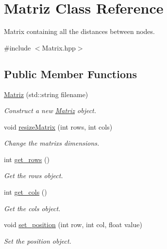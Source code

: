 \hypertarget{classMatriz}{}\section{Matriz Class Reference}
\label{classMatriz}


Matrix containing all the distances between nodes.  




{\ttfamily \#include $<$Matrix.\+hpp$>$}

\subsection*{Public Member Functions}
\begin{DoxyCompactItemize}
\item 
\hyperlink{classMatriz_a388709cfee356a0c78b66e3f538e9318}{Matriz} (std\+::string filename)
\begin{DoxyCompactList}\small\item\em Construct a new \hyperlink{classMatriz}{Matriz} object. \end{DoxyCompactList}\item 
void \hyperlink{classMatriz_aa929f933e9088dc0efecaa9a46d555d9}{resize\+Matrix} (int rows, int cols)
\begin{DoxyCompactList}\small\item\em Change the matrix\textquotesingle{}s dimensions. \end{DoxyCompactList}\item 
int \hyperlink{classMatriz_a6b18342f8c083baece693ff41185a206}{get\+\_\+rows} ()
\begin{DoxyCompactList}\small\item\em Get the rows object. \end{DoxyCompactList}\item 
int \hyperlink{classMatriz_ad6915f9b31f93230a3ce05d01d23a47b}{get\+\_\+cols} ()
\begin{DoxyCompactList}\small\item\em Get the cols object. \end{DoxyCompactList}\item 
void \hyperlink{classMatriz_a3641ea6e8f91cffd9073c22a71082cf8}{set\+\_\+position} (int row, int col, float value)
\begin{DoxyCompactList}\small\item\em Set the position object. \end{DoxyCompactList}\item 

\end{DoxyCompactItemize}
